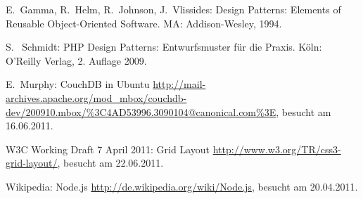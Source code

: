 \begin{thebibliography}{99}

  E.\ Gamma, R.\ Helm, R.\ Johnson, J.\ Vlissides:
    Design Patterns: Elements of Reusable Object-Oriented Software.
	MA: Addison-Wesley, 1994.

  S. \ Schmidt:
	PHP Design Patterns: Entwurfsmuster für die Praxis.
	Köln: O'Reilly Verlag, 2. Auflage 2009.


\hspace{-\leftmargin}{\Large\bfseries Web-Referenzen} %

	E.\ Murphy:
	CouchDB in Ubuntu
	\url{http://mail-archives.apache.org/mod_mbox/couchdb-dev/200910.mbox/%3C4AD53996.3090104@canonical.com%3E}, besucht am 16.06.2011.

	W3C Working Draft 7 April 2011:
	Grid Layout
	\url{http://www.w3.org/TR/css3-grid-layout/}, besucht am 22.06.2011.

  Wikipedia: Node.js
    \url{http://de.wikipedia.org/wiki/Node.js}, besucht am 20.04.2011.
	

\end{thebibliography}